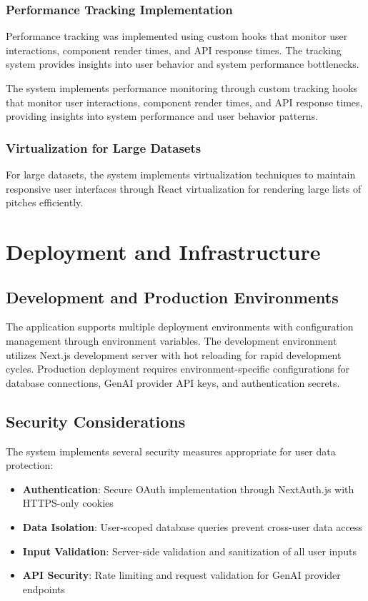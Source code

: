 \subsubsection{Performance Tracking Implementation}
Performance tracking was implemented using custom hooks that monitor user interactions, component render times, and API response times. The tracking system provides insights into user behavior and system performance bottlenecks.

The system implements performance monitoring through custom tracking hooks that monitor user interactions, component render times, and API response times, providing insights into system performance and user behavior patterns.

\subsubsection{Virtualization for Large Datasets}
For large datasets, the system implements virtualization techniques to maintain responsive user interfaces through React virtualization for rendering large lists of pitches efficiently.

\section{Deployment and Infrastructure}

\subsection{Development and Production Environments}
The application supports multiple deployment environments with configuration management through environment variables. The development environment utilizes Next.js development server with hot reloading for rapid development cycles. Production deployment requires environment-specific configurations for database connections, GenAI provider API keys, and authentication secrets.


\subsection{Security Considerations}
The system implements several security measures appropriate for user data protection:
\begin{itemize}
  \item \textbf{Authentication}: Secure OAuth implementation through NextAuth.js with HTTPS-only cookies
  \item \textbf{Data Isolation}: User-scoped database queries prevent cross-user data access
  \item \textbf{Input Validation}: Server-side validation and sanitization of all user inputs
  \item \textbf{API Security}: Rate limiting and request validation for GenAI provider endpoints
\end{itemize}

